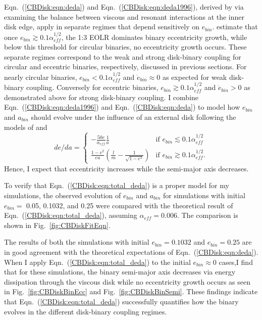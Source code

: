 Eqn.~(\ref{CBDisk:eqn:deda}) and Eqn.~(\ref{CBDisk:eqn:deda1996}), derived by \citet{Artymowicz1996b} via examining the balance between viscous and resonant interactions at the inner 
disk edge, apply in separate regimes that depend sensitively on $e_{bin}$.  \citet{Artymowicz1996b} estimate that once $e_{bin} \gtrsim 0.1 \alpha_{eff}^{1/2}$, the 1:3 
EOLR dominates binary eccentricity growth, while below this threshold for circular binaries, no eccentricity growth occurs.  These separate regimes correspond 
to the weak and strong disk-binary coupling for circular and eccentric binaries, respectively, discussed in previous sections.  For nearly circular binaries, 
$e_{bin} < 0.1 \alpha_{eff}^{1/2}$ and $\dot{e}_{bin} \approx 0$ as expected for weak disk-binary coupling.  Conversely for eccentric binaries, $e_{bin} \gtrsim 
0.1 \alpha_{eff}^{1/2}$ and $\dot{e}_{bin} > 0$ as demonstrated above for strong disk-binary coupling.  I combine Eqn.~(\ref{CBDisk:eqn:deda1996}) and 
Eqn.~(\ref{CBDisk:eqn:deda}) to model how $e_{bin}$ and $a_{bin}$ should evolve under the influence of an external disk following the models of \citet{Artymowicz1996b,Artymowicz2000} and 
\citet{Dermine2013}
\begin{equation}
\label{CBDisk:eqn:total_deda}
de/da=
\begin{cases}
-\frac{50e}{\alpha_{eff}}\frac{1}{a} & \text{if } e_{bin} \lesssim 0.1 \alpha_{eff}^{1/2}\\
\frac{1 - e^2}{ea} \left(\frac{l}{m} - \frac{1}{\sqrt{1 - e^2}}\right) & \text{if } e_{bin} \gtrsim 0.1 \alpha_{eff}^{1/2}.
\end{cases}
\end{equation}
Hence, I expect that eccentricity increases while the semi-major axis decreases.

To verify that Eqn.~(\ref{CBDisk:eqn:total_deda}) is a proper model for my simulations, the observed evolution of $e_{bin}$ and $a_{bin}$ for simulations with initial $e_{bin} =$ 0.05, 0.1032, and 0.25 were compared with the theoretical result of Eqn.~(\ref{CBDisk:eqn:total_deda}), assuming $\alpha_{eff} = 0.006$.  The comparison is shown in Fig.~\ref{fig:CBDiskFitEqn}.

The results of both the simulations with initial $e_{bin} = 0.1032$ and $e_{bin} = 0.25$ are in good agreement with the theoretical expectations of Eqn.~(\ref{CBDisk:eqn:deda}).  When I apply Eqn.~(\ref{CBDisk:eqn:total_deda}) to the initial $e_{bin} \approx 0$ cases,I find that for these simulations, the binary semi-major axis decreases via energy dissipation through the viscous disk while no eccentricity growth occurs as seen in Fig.~\ref{fig:CBDiskBinEcc} and Fig.~\ref{fig:CBDiskBinSemi}.  These findings indicate that Eqn.~(\ref{CBDisk:eqn:total_deda}) successfully quantifies how the binary evolves in the different disk-binary coupling regimes.

